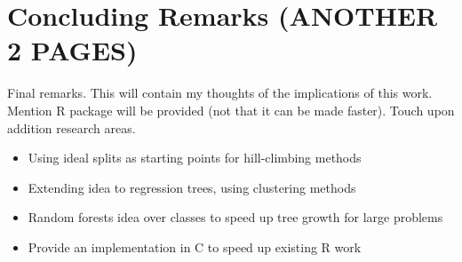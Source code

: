 \chapter{Concluding Remarks (ANOTHER 2 PAGES)}
\label{ConcludingRemarks}
Final remarks. This will contain my thoughts of the implications of this work. Mention R package will be provided (not that it can be made faster). Touch upon addition research areas.\\

\begin{itemize}
\item Using ideal splits as starting points for hill-climbing methods
\item Extending idea to regression trees, using clustering methods
\item Random forests idea over classes to speed up tree growth for large problems
\item Provide an implementation in C to speed up existing R work
\end{itemize}
